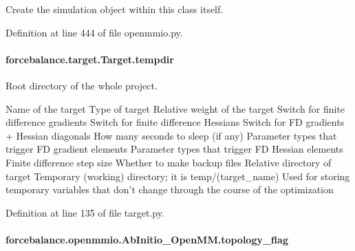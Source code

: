 Create the simulation object within this class itself. 



Definition at line 444 of file openmmio.\-py.

\hypertarget{classforcebalance_1_1target_1_1Target_aa1f01b5b78db253b5b66384ed11ed193}{
\paragraph[{tempdir}]{\setlength{\rightskip}{0pt plus 5cm}forcebalance.\-target.\-Target.\-tempdir\hspace{0.3cm}{\ttfamily [inherited]}}}\label{classforcebalance_1_1target_1_1Target_aa1f01b5b78db253b5b66384ed11ed193}


Root directory of the whole project. 

Name of the target Type of target Relative weight of the target Switch for finite difference gradients Switch for finite difference Hessians Switch for F\-D gradients + Hessian diagonals How many seconds to sleep (if any) Parameter types that trigger F\-D gradient elements Parameter types that trigger F\-D Hessian elements Finite difference step size Whether to make backup files Relative directory of target Temporary (working) directory; it is temp/(target\-\_\-name) Used for storing temporary variables that don't change through the course of the optimization 

Definition at line 135 of file target.\-py.

\hypertarget{classforcebalance_1_1openmmio_1_1AbInitio__OpenMM_ab4e95ab839ecd731ac7805c8a3ed08aa}{
\paragraph[{topology\-\_\-flag}]{\setlength{\rightskip}{0pt plus 5cm}forcebalance.\-openmmio.\-Ab\-Initio\-\_\-\-Open\-M\-M.\-topology\-\_\-flag}}\label{classforcebalance_1_1openmmio_1_1AbInitio__OpenMM_ab4e95ab839ecd731ac7805c8a3ed08aa}


